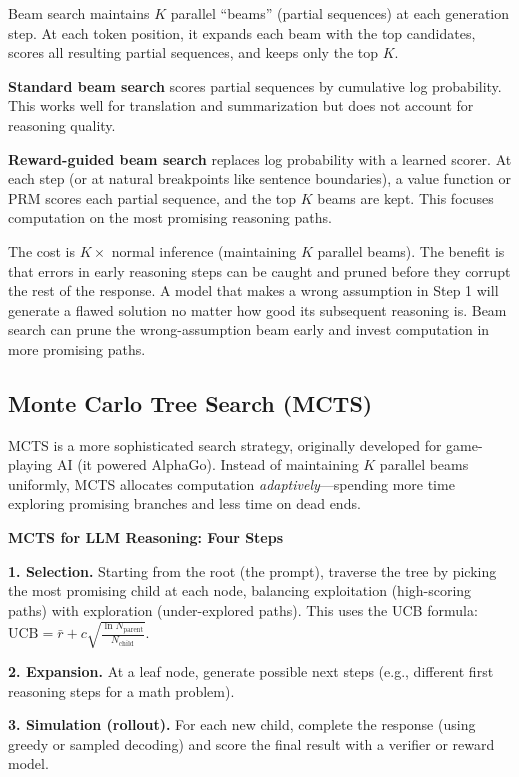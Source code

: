 \begin{chapterenv}
Beam search maintains $K$ parallel ``beams'' (partial sequences) at each generation step. At each token position, it expands each beam with the top candidates, scores all resulting partial sequences, and keeps only the top $K$.

\textbf{Standard beam search} scores partial sequences by cumulative log probability. This works well for translation and summarization but does not account for reasoning quality.

\textbf{Reward-guided beam search} replaces log probability with a learned scorer. At each step (or at natural breakpoints like sentence boundaries), a value function or PRM scores each partial sequence, and the top $K$ beams are kept. This focuses computation on the most promising reasoning paths.

The cost is $K \times$ normal inference (maintaining $K$ parallel beams). The benefit is that errors in early reasoning steps can be caught and pruned before they corrupt the rest of the response. A model that makes a wrong assumption in Step 1 will generate a flawed solution no matter how good its subsequent reasoning is. Beam search can prune the wrong-assumption beam early and invest computation in more promising paths.

\subsection{Monte Carlo Tree Search (MCTS)}

MCTS is a more sophisticated search strategy, originally developed for game-playing AI (it powered AlphaGo). Instead of maintaining $K$ parallel beams uniformly, MCTS allocates computation \textit{adaptively}---spending more time exploring promising branches and less time on dead ends.

\begin{infobox}
\textbf{MCTS for LLM Reasoning: Four Steps}

\textbf{1. Selection.} Starting from the root (the prompt), traverse the tree by picking the most promising child at each node, balancing exploitation (high-scoring paths) with exploration (under-explored paths). This uses the UCB formula: $\text{UCB} = \bar{r} + c\sqrt{\frac{\ln N_{\text{parent}}}{N_{\text{child}}}}$.

\textbf{2. Expansion.} At a leaf node, generate possible next steps (e.g., different first reasoning steps for a math problem).

\textbf{3. Simulation (rollout).} For each new child, complete the response (using greedy or sampled decoding) and score the final result with a verifier or reward model.


\end{infobox}
\end{chapterenv}

